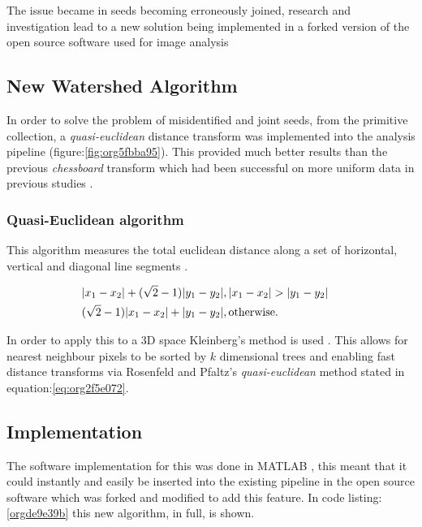 \documentclass[11pt]{report}
\begin{document}
The issue became in seeds becoming erroneously joined, research and investigation lead to a new solution being implemented in a forked version of the open source software used for image analysis \cite{Hughes2017}

\subsection{New Watershed Algorithm}
\label{sec:org0eeee99}

In order to solve the problem of misidentified and joint seeds, from the primitive collection,
a  \emph{quasi-euclidean} distance transform was implemented into the analysis pipeline (figure:\ref{fig:org5fbba95}). This provided much better results than the previous
\emph{chessboard} transform which had been successful on more uniform data in previous studies \cite{Hughes2017}.

\subsubsection{Quasi-Euclidean algorithm}
\label{sec:org66131b2}

This algorithm measures the total euclidean distance along a set of horizontal, vertical and diagonal
line segments \cite{Pfaltz1966}.

\begin{align}
\label{eq:org2f5e072}
  &\begin{aligned}
&|x_1-x_2|+(\sqrt{2}-1)|y_1-y_2|, |x_1-x_2| > |y_1-y_2| \\
      &(\sqrt{2}-1)|x_1-x_2| + |y_1-y_2|, \textup{otherwise.}
  \end{aligned}
\end{align}

In order to apply this to a 3D space Kleinberg's method is used  \cite{Kleinberg1997}. This allows for nearest neighbour pixels to be sorted by \(k\) dimensional trees
and enabling fast distance transforms via Rosenfeld and Pfaltz's \emph{quasi-euclidean} method stated in equation:\ref{eq:org2f5e072}.

\subsection{Implementation}
\label{sec:org6b5d4a2}

The software implementation for this was done in MATLAB \cite{MATHWORKS2017}, this meant that it could instantly and easily be inserted into the existing pipeline in the open source software which was forked and modified to add this feature. In code listing:\ref{orgde9e39b} this new algorithm, in full, is shown.
\end{document}
